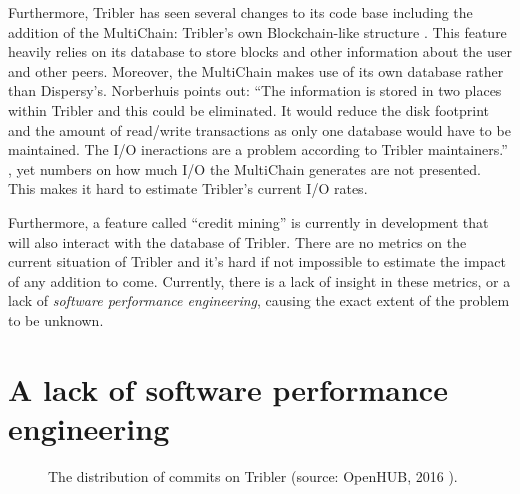 Furthermore, Tribler has seen several changes to its code base including the addition of the MultiChain: Tribler's own Blockchain-like structure \cite{norberhuis2015multichain}.
This feature heavily relies on its database to store blocks and other information about the user and other peers.
Moreover, the MultiChain makes use of its own database rather than Dispersy's.
Norberhuis points out: \enquote{The information is stored in two places within Tribler and this could be eliminated. It would reduce the disk footprint and the amount of read/write transactions as only one database would have to be maintained. The I/O ineractions are a problem according to Tribler maintainers.} \cite{norberhuis2015multichain}, yet numbers on how much I/O the MultiChain generates are not presented.
This makes it hard to estimate Tribler's current I/O rates.

Furthermore, a feature called \enquote{credit mining} is currently in development that will also interact with the database of Tribler.
There are no metrics on the current situation of Tribler and it's hard if not impossible to estimate the impact of any addition to come.
Currently, there is a lack of insight in these metrics, or a lack of \emph{software performance engineering}, causing the exact extent of the problem to be unknown.


\section{A lack of software performance engineering}

\begin{figure}[!h]
	\caption{The distribution of commits on Tribler (source: OpenHUB, 2016 \cite{openhub2016tribler}).}
	\label{fig:commits_openhub}
\end{figure}

